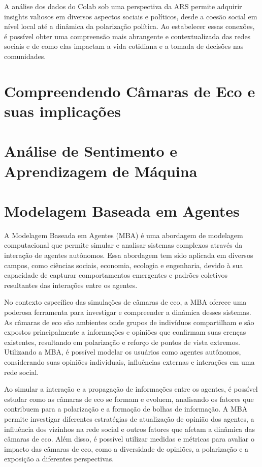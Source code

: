 A análise dos dados do Colab sob uma perspectiva da ARS permite adquirir insights valiosos em diversos aspectos sociais e políticos, desde a coesão social em nível local até a dinâmica da polarização política. Ao estabelecer essas conexões, é possível obter uma compreensão mais abrangente e contextualizada das redes sociais e de como elas impactam a vida cotidiana e a tomada de decisões nas comunidades.

\section{Compreendendo Câmaras de Eco e suas implicações}
\label{05_sub_01_echochambers}


\section{Análise de Sentimento e Aprendizagem de Máquina}
\label{05_02_sentiment}


\section{Modelagem Baseada em Agentes}
\label{05_mba}
A Modelagem Baseada em Agentes (MBA) é uma abordagem de modelagem computacional que permite simular e analisar sistemas complexos através da interação de agentes autônomos. Essa abordagem tem sido aplicada em diversos campos, como ciências sociais, economia, ecologia e engenharia, devido à sua capacidade de capturar comportamentos emergentes e padrões coletivos resultantes das interações entre os agentes.

No contexto específico das simulações de câmaras de eco, a MBA oferece uma poderosa ferramenta para investigar e compreender a dinâmica desses sistemas. As câmaras de eco são ambientes onde grupos de indivíduos compartilham e são expostos principalmente a informações e opiniões que confirmam suas crenças existentes, resultando em polarização e reforço de pontos de vista extremos. Utilizando a MBA, é possível modelar os usuários como agentes autônomos, considerando suas opiniões individuais, influências externas e interações em uma rede social.

Ao simular a interação e a propagação de informações entre os agentes, é possível estudar como as câmaras de eco se formam e evoluem, analisando os fatores que contribuem para a polarização e a formação de bolhas de informação. A MBA permite investigar diferentes estratégias de atualização de opinião dos agentes, a influência dos vizinhos na rede social e outros fatores que afetam a dinâmica das câmaras de eco. Além disso, é possível utilizar medidas e métricas para avaliar o impacto das câmaras de eco, como a diversidade de opiniões, a polarização e a exposição a diferentes perspectivas.


